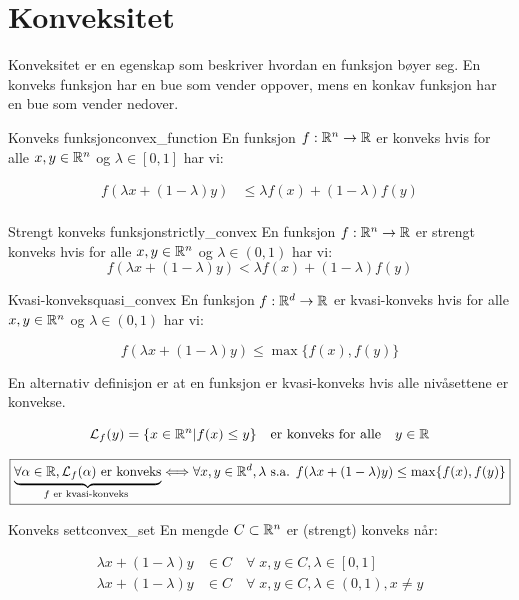 \section{Konveksitet}

Konveksitet er en egenskap som beskriver hvordan en funksjon bøyer seg.
En konveks funksjon har en bue som vender oppover, mens en konkav funksjon har en bue som vender nedover.

\begin{definition}{Konveks funksjon}{convex_function}
  En funksjon \(f: \mathbb{R}^n \to \mathbb{R}\) er konveks hvis for alle \(x, y \in \mathbb{R}^n\) og \(\lambda \in [0, 1]\) har vi:

  \begin{align*}
    f(\lambda x + (1 - \lambda)y) & \leq \lambda f(x) + (1 - \lambda)f(y) \\
  \end{align*}

\end{definition}
\begin{remark}{Strengt konveks funksjon}{strictly_convex}
  En funksjon \(f: \mathbb{R}^n \to \mathbb{R}\) er strengt konveks hvis for alle \(x, y \in \mathbb{R}^n\) og \(\lambda \in (0, 1)\) har vi:
  \[
    f(\lambda x + (1 - \lambda)y) < \lambda f(x) + (1 - \lambda)f(y)
  \]
\end{remark}

\begin{remark}{Kvasi-konveks}{quasi_convex}
  En funksjon \(f: \mathbb{R}^d \to \mathbb{R}\) er kvasi-konveks hvis for alle \(x, y \in \mathbb{R}^n\) og \(\lambda \in (0, 1)\) har vi:

  \[
    f(\lambda x + (1 - \lambda)y) \leq \max\{f(x), f(y)\}
  \]

  En alternativ definisjon er at en funksjon er kvasi-konveks hvis alle nivåsettene er konvekse.

  \[
    \mathcal{L}_f(y) = \{x \in \mathbb{R}^n | f(x) \leq y\} \quad \text{er konveks for alle} \quad y \in \mathbb{R}
  \]

  \[
    \boxed{\underbrace{\forall \alpha \in \mathbb{R}, \mathcal{L}_f(\alpha) \text{ er konveks}}_{f \text{ er kvasi-konveks }}\Longleftrightarrow \forall x, y \in \mathbb{R}^d,\lambda \text{ s.a. } f(\lambda x + (1-\lambda)y) \leq \max \{ f(x), f(y) \}}
  \]
\end{remark}


\begin{definition}{Konveks sett}{convex_set}
  En mengde \(C \subset \mathbb{R}^n\) er (strengt) konveks når:

  \begin{align*}
    \lambda x + (1 - \lambda)y & \in C \quad \forall \; x, y \in C, \lambda \in [0, 1] \tag{Konveks}                   \\
    \lambda x + (1 - \lambda)y & \in C \quad \forall \; x, y \in C, \lambda \in (0, 1), x \neq y \tag{Strengt konveks}
  \end{align*}

\end{definition}


